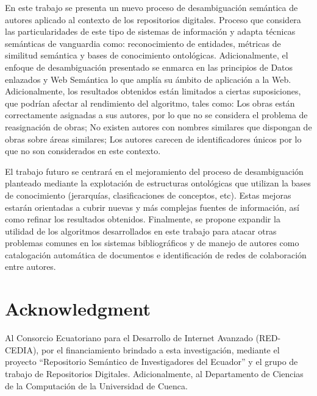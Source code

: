 \documentclass[conference]{IEEEtran}
\begin{document}
En este trabajo se presenta un nuevo proceso de desambiguación semántica de autores aplicado al contexto de los repositorios digitales. Proceso que considera las particularidades de este tipo de sistemas de información y adapta técnicas semánticas de vanguardia como: reconocimiento de entidades, métricas de similitud semántica y bases de conocimiento ontológicas. Adicionalmente, el enfoque de desambiguación presentado se enmarca en las principios de Datos enlazados y Web Semántica lo que amplía su ámbito de aplicación a la Web. 
Adicionalmente, los resultados obtenidos están limitados a ciertas suposiciones, que podrían afectar al rendimiento del algoritmo, tales como:  Los obras están correctamente asignadas a sus autores, por lo que no se considera el problema de reasignación de obras; No existen autores con nombres similares que  dispongan de obras sobre  áreas similares;  Los autores carecen de identificadores únicos por lo que no son considerados en este contexto.

El trabajo futuro se centrará en el mejoramiento del proceso de desambiguación planteado mediante la explotación de estructuras ontológicas que utilizan la bases de conocimiento (jerarquías, clasificaciones de conceptos, etc). Estas mejoras estarán orientadas a cubrir nuevas y más complejas fuentes de información, así como refinar los resultados obtenidos. Finalmente, se propone expandir la utilidad de los algoritmos desarrollados en este trabajo para atacar otras problemas comunes en los sistemas bibliográficos y de manejo de autores como  catalogación automática de documentos e identificación de redes de colaboración entre autores.

\section*{Acknowledgment}
Al Consorcio Ecuatoriano para el Desarrollo de Internet Avanzado (RED-CEDIA), por el financiamiento brindado a esta investigación, mediante el proyecto “Repositorio Semántico de Investigadores del Ecuador” y el grupo de trabajo de Repositorios Digitales. Adicionalmente, al Departamento de Ciencias de la Computación de la Universidad de Cuenca.





\end{document}
